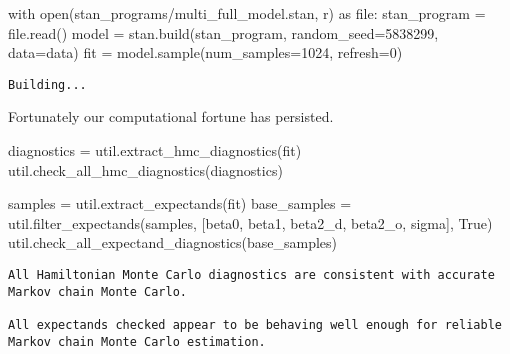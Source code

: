 \documentclass[
  letterpaper,
  DIV=11,
  numbers=noendperiod]{scrartcl}
\newenvironment{Shaded}{\begin{snugshade}}{\end{snugshade}}
\newcommand{\BuiltInTok}[1]{\textcolor[rgb]{0.00,0.23,0.31}{#1}}
\newcommand{\ControlFlowTok}[1]{\textcolor[rgb]{0.00,0.23,0.31}{#1}}
\newcommand{\DecValTok}[1]{\textcolor[rgb]{0.68,0.00,0.00}{#1}}
\newcommand{\ImportTok}[1]{\textcolor[rgb]{0.00,0.46,0.62}{#1}}
\newcommand{\NormalTok}[1]{\textcolor[rgb]{0.00,0.23,0.31}{#1}}
\newcommand{\OperatorTok}[1]{\textcolor[rgb]{0.37,0.37,0.37}{#1}}
\newcommand{\StringTok}[1]{\textcolor[rgb]{0.13,0.47,0.30}{#1}}
\newcommand{\VariableTok}[1]{\textcolor[rgb]{0.07,0.07,0.07}{#1}}
\begin{document}
\begin{Shaded}
\begin{Highlighting}[]
\ControlFlowTok{with} \BuiltInTok{open}\NormalTok{(}\StringTok{\textquotesingle{}stan\_programs/multi\_full\_model.stan\textquotesingle{}}\NormalTok{, }\StringTok{\textquotesingle{}r\textquotesingle{}}\NormalTok{) }\ImportTok{as} \BuiltInTok{file}\NormalTok{:}
\NormalTok{  stan\_program }\OperatorTok{=} \BuiltInTok{file}\NormalTok{.read()}
\NormalTok{model }\OperatorTok{=}\NormalTok{ stan.build(stan\_program, random\_seed}\OperatorTok{=}\DecValTok{5838299}\NormalTok{, data}\OperatorTok{=}\NormalTok{data)}
\NormalTok{fit }\OperatorTok{=}\NormalTok{ model.sample(num\_samples}\OperatorTok{=}\DecValTok{1024}\NormalTok{, refresh}\OperatorTok{=}\DecValTok{0}\NormalTok{)}
\end{Highlighting}
\end{Shaded}

\begin{verbatim}
Building...
\end{verbatim}

Fortunately our computational fortune has persisted.

\begin{Shaded}
\begin{Highlighting}[]
\NormalTok{diagnostics }\OperatorTok{=}\NormalTok{ util.extract\_hmc\_diagnostics(fit)}
\NormalTok{util.check\_all\_hmc\_diagnostics(diagnostics)}

\NormalTok{samples }\OperatorTok{=}\NormalTok{ util.extract\_expectands(fit)}
\NormalTok{base\_samples }\OperatorTok{=}\NormalTok{ util.filter\_expectands(samples,}
\NormalTok{                                      [}\StringTok{\textquotesingle{}beta0\textquotesingle{}}\NormalTok{, }\StringTok{\textquotesingle{}beta1\textquotesingle{}}\NormalTok{,}
                                       \StringTok{\textquotesingle{}beta2\_d\textquotesingle{}}\NormalTok{, }\StringTok{\textquotesingle{}beta2\_o\textquotesingle{}}\NormalTok{,}
                                       \StringTok{\textquotesingle{}sigma\textquotesingle{}}\NormalTok{],}
                                      \VariableTok{True}\NormalTok{)}
\NormalTok{util.check\_all\_expectand\_diagnostics(base\_samples)}
\end{Highlighting}
\end{Shaded}

\begin{verbatim}
All Hamiltonian Monte Carlo diagnostics are consistent with accurate
Markov chain Monte Carlo.
 
All expectands checked appear to be behaving well enough for reliable
Markov chain Monte Carlo estimation.
 
\end{verbatim}
\end{document}
